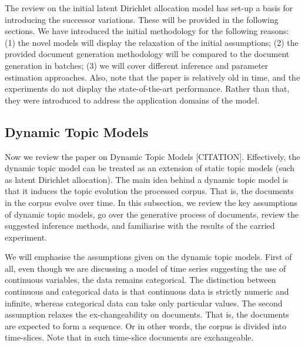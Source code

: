 \documentclass{mprop}
\begin{document}
\par The review on the initial latent Dirichlet allocation model has set-up a basis for introducing the successor variations. These will be provided in the following sections. We have introduced the initial methodology for the following reasons: (1) the novel models will display the relaxation of the initial assumptions; (2) the provided document generation methodology will be compared to the document generation in batches; (3) we will cover different inference and parameter estimation approaches. Also, note that the paper is relatively old in time, and the experiments do not display the state-of-the-art performance. Rather than that, they were introduced to address the application domains of the model. 

\subsection{Dynamic Topic Models}

\par Now we review the paper on Dynamic Topic Models [CITATION]. Effectively, the dynamic topic model can be treated as an extension of static topic models (such as latent Dirichlet allocation). The main idea behind a dynamic topic model is that it induces the topic evolution the processed corpus. That is, the documents in the corpus evolve over time. In this subsection, we review the key assumptions of dynamic topic models, go over the generative process of documents, review the suggested inference methods, and familiarise with the results of the carried experiment. 

\par We will emphasise the assumptions given on the dynamic topic models. First of all, even though we are discussing a model of time series suggesting the use of continuous variables, the data remains categorical. The distinction between continuous and categorical data is that continuous data is strictly numeric and infinite, whereas categorical data can take only particular values. The second assumption relaxes the ex-changeability on documents. That is, the documents are expected to form a sequence. Or in other words, the corpus is divided into time-slices. Note that in such time-slice documents are exchangeable.  
\end{document}
